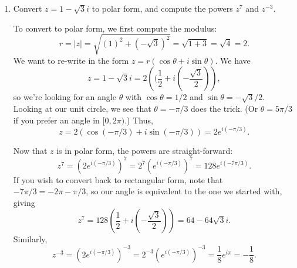 \documentclass[12pt]{article}
\newcommand{\abs}[1]{\lvert #1\rvert}
\begin{document}
\bigskip

\begin{enumerate}
\addtocounter{enumi}{2}
\item Convert $z=1-\sqrt{3}i$ to polar form, and compute the powers $z^7$ and $z^{-3}$.

\medskip

To convert to polar form, we first compute the modulus:
\[
r=\abs{z} = \sqrt{(1)^2+(-\sqrt{3})^2} = \sqrt{1+3}=\sqrt{4}=2.
\]
We want to re-write in the form $z=r(\cos\theta+i\sin\theta)$. We have
\[
z=1-\sqrt{3}i = 2\left((\frac{1}{2}+i\left(-\frac{\sqrt{3}}{2}\right)\right),
\]
so we're looking for an angle $\theta$ with $\cos\theta = 1/2$ and $\sin\theta=-\sqrt{3}/2$. Looking at our unit circle, we see that $\theta = -\pi/3$ does the trick. (Or $\theta = 5\pi/3$ if you prefer an angle in $[0,2\pi)$.) Thus,
\[
z = 2(\cos(-\pi/3)+i\sin(-\pi/3)) = 2e^{i(-\pi/3)}.
\]

Now that $z$ is in polar form, the powers are straight-forward:
\[
z^7 = (2e^{i(-\pi/3)})^7 = 2^7(e^{i(-\pi/3)})^7 = 128e^{i(-7\pi/3)}.
\]
If you wish to convert back to rectangular form, note that $-7\pi/3 = -2\pi-\pi/3$, so our angle is equivalent to the one we started with, giving
\[
z^7=128\left(\frac12+i\left(-\frac{\sqrt{3}}{2}\right)\right) = 64-64\sqrt{3}i.
\]
Similarly,
\[
z^{-3} = (2e^{i(-\pi/3)})^{-3} = 2^{-3}(e^{i(-\pi/3)})^{-3} = \frac{1}{8}e^{i\pi} = -\frac18.
\]
\end{enumerate}
  
\end{document}
